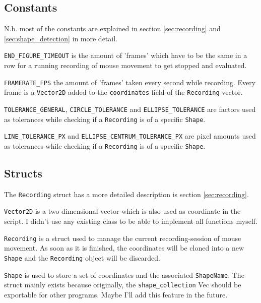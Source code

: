 \documentclass[12pt, a4paper]{article}
\begin{document}
        {
            \raggedright
            \subsection{Constants}
                N.b. most of the constants are explained in section \ref{sec:recording} and \ref{sec:shape_detection} in more detail.\break

                \texttt{END\_FIGURE\_TIMEOUT} is the amount of 'frames' which have to be the same in a row for a running recording of mouse movement to get stopped and evaluated.\break

                \texttt{FRAMERATE\_FPS} the amount of 'frames' taken every second while recording. Every frame is a \texttt{Vector2D} added to the \texttt{coordinates} field of the \texttt{Recording} vector.\break

                \texttt{TOLERANCE\_GENERAL}, \texttt{CIRCLE\_TOLERANCE} and \texttt{ELLIPSE\_TOLERANCE} are factors used as tolerances while checking if a \texttt{Recording} is of a specific \texttt{Shape}.\break

                \texttt{LINE\_TOLERANCE\_PX} and \texttt{ELLIPSE\_CENTRUM\_TOLERANCE\_PX} are pixel amounts used as tolerances while checking if a \texttt{Recording} is of a specific \texttt{Shape}.

            \subsection{Structs}
                \label{sec:structs}
                The \texttt{Recording} struct has a more detailed description is section \ref{sec:recording}.\break

                \texttt{Vector2D} is a two-dimensional vector which is also used as coordinate in the script. I didn't use any existing class to be able to implement all functions myself.\break

                \texttt{Recording} is a struct used to manage the current recording-session of mouse movement. As soon as it is finished, the coordinates will be cloned into a new \texttt{Shape} and the \texttt{Recording} object will be discarded.\break

                \texttt{Shape} is used to store a set of coordinates and the associated \texttt{ShapeName}. The struct mainly exists because originally, the \texttt{shape\_collection} Vec should be exportable for other programs. Maybe I'll add this feature in the future.\break

}
\end{document}
